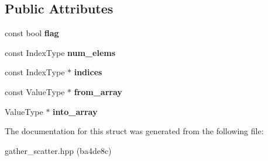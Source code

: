 \subsection*{Public Attributes}
\begin{DoxyCompactItemize}
\item 
\mbox{\label{structGatherScatter_ae0a023c43a44d3398c337759f73c450a}} 
const bool {\bfseries flag}
\item 
\mbox{\label{structGatherScatter_a7a77a08c144b7640c2e595ffcb95e9f6}} 
const Index\+Type {\bfseries num\+\_\+elems}
\item 
\mbox{\label{structGatherScatter_acfd3e8f7792e7e8d84558210c80feb8d}} 
const Index\+Type $\ast$ {\bfseries indices}
\item 
\mbox{\label{structGatherScatter_adbdf8c559625f452f62843c36a629993}} 
const Value\+Type $\ast$ {\bfseries from\+\_\+array}
\item 
\mbox{\label{structGatherScatter_a389b25cdf1bee5084d19f6df1ea53937}} 
Value\+Type $\ast$ {\bfseries into\+\_\+array}
\end{DoxyCompactItemize}


The documentation for this struct was generated from the following file\+:\begin{DoxyCompactItemize}
\item 
gather\+\_\+scatter.\+hpp (ba4de8c)\end{DoxyCompactItemize}
